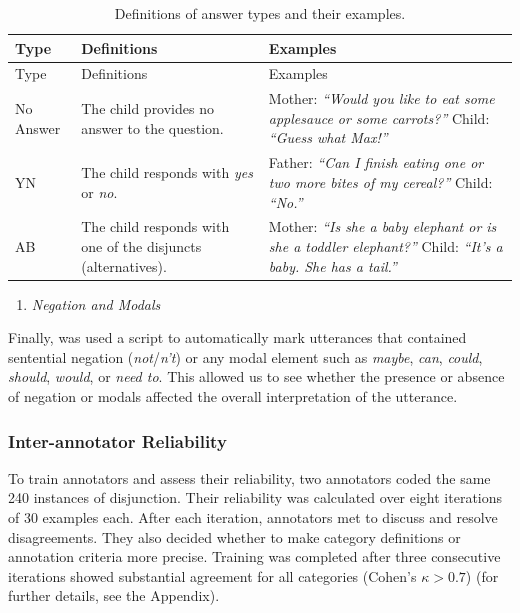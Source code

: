 \documentclass[
  english,
  ,man,floatsintext]{apa6}
\providecommand{\tightlist}{%
  \setlength{\itemsep}{0pt}\setlength{\parskip}{0pt}}
\begin{document}
\begin{longtable}[]{@{}
  >{\raggedright\arraybackslash}p{}
  >{\raggedright\arraybackslash}p{}
  >{\raggedright\arraybackslash}p{}@{}}
\caption{\label{tab:answerTypes} Definitions of answer types and their examples.}\tabularnewline
\toprule
Type & Definitions & Examples \\
\midrule
\endfirsthead
\toprule
Type & Definitions & Examples \\
\midrule
\endhead
No Answer & The child provides no answer to the question. & Mother: \emph{``Would you like to eat some applesauce or some carrots?''} Child: \emph{``Guess what Max!''} \\
YN & The child responds with \emph{yes} or \emph{no}. & Father: \emph{``Can I finish eating one or two more bites of my cereal?''} Child: \emph{``No.''} \\
AB & The child responds with one of the disjuncts (alternatives). & Mother: \emph{``Is she a baby elephant or is she a toddler elephant?''} Child: \emph{``It's a baby. She has a tail.''} \\
\bottomrule
\end{longtable}

\begin{enumerate}
\def\labelenumi{\arabic{enumi}.}
\setcounter{enumi}{7}
\tightlist
\item
  \emph{Negation and Modals}
\end{enumerate}

Finally, was used a script to automatically mark utterances that contained sentential negation (\emph{not}/\emph{n't}) or any modal element such as \emph{maybe}, \emph{can}, \emph{could}, \emph{should}, \emph{would}, or \emph{need to}. This allowed us to see whether the presence or absence of negation or modals affected the overall interpretation of the utterance.

\hypertarget{inter-annotator-reliability}{%
\subsubsection{Inter-annotator Reliability}\label{inter-annotator-reliability}}

To train annotators and assess their reliability, two annotators coded the same 240 instances of disjunction. Their reliability was calculated over eight iterations of 30 examples each. After each iteration, annotators met to discuss and resolve disagreements. They also decided whether to make category definitions or annotation criteria more precise. Training was completed after three consecutive iterations showed substantial agreement for all categories (Cohen's \(\kappa > 0.7\)) (for further details, see the Appendix).
\end{document}
